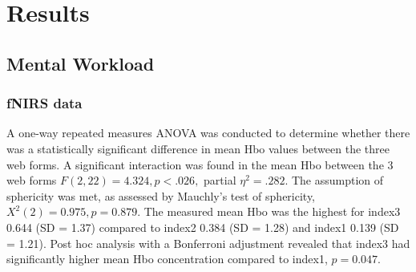 \documentclass[../main/Feedback.tex]{subfiles}
\begin{document}
\section{Results}
		\subsection{Mental Workload}
		\subsubsection{fNIRS data}
		A one-way repeated measures ANOVA was conducted to determine whether there was a statistically significant difference in mean Hbo values between the three web forms. A significant interaction was found in the mean Hbo between the 3 web forms $F(2,22)=4.324, p<.026,$ partial $\eta^{2}=.282$. The assumption of sphericity was met, as assessed by Mauchly's test of sphericity, $X^{2}(2) = 0.975, p = 0.879$. The measured mean Hbo was the highest for index3 0.644 (SD = 1.37) compared to index2 0.384 (SD = 1.28) and index1 0.139 (SD = 1.21). Post hoc analysis with a Bonferroni adjustment revealed that index3 had significantly higher mean Hbo concentration compared to index1, $p=0.047$. 
		
		
\end{document}
